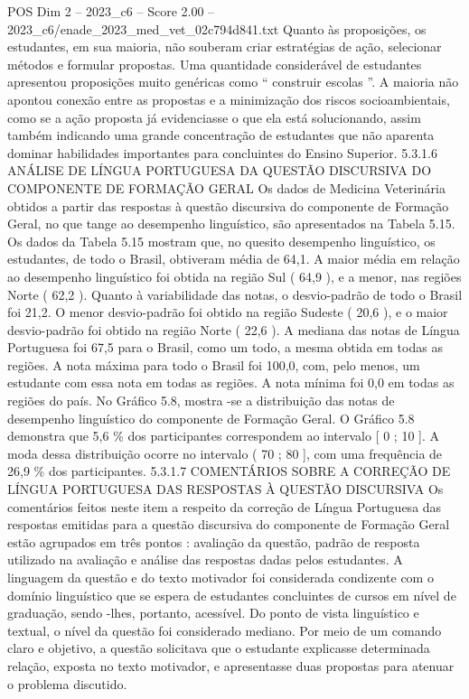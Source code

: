 \begin{textsample}{POS Dim 2 – 2023\_c6 – Score 2.00 – 2023\_c6/enade\_2023\_med\_vet\_02c794d841.txt}
Quanto às proposições, os estudantes, em sua maioria, não souberam criar estratégias de ação, selecionar métodos e formular propostas.
Uma quantidade considerável de estudantes apresentou proposições muito genéricas como “ construir escolas ”.
A maioria não apontou conexão entre as propostas e a minimização dos riscos socioambientais, como se a ação proposta já evidenciasse o que ela está solucionando, assim também indicando uma grande concentração de estudantes que não aparenta dominar habilidades importantes para concluintes do Ensino Superior. 5.3.1.6 ANÁLISE DE LÍNGUA PORTUGUESA DA QUESTÃO DISCURSIVA DO COMPONENTE DE FORMAÇÃO GERAL Os dados de Medicina Veterinária obtidos a partir das respostas à questão discursiva do componente de Formação Geral, no que tange ao desempenho linguístico, são apresentados na Tabela 5.15.
Os dados da Tabela 5.15 mostram que, no quesito desempenho linguístico, os estudantes, de todo o Brasil, obtiveram média de 64,1.
A maior média em relação ao desempenho linguístico foi obtida na região Sul ( 64,9 ), e a menor, nas regiões Norte ( 62,2 ).
Quanto à variabilidade das notas, o desvio-padrão de todo o Brasil foi 21,2.
O menor desvio-padrão foi obtido na região Sudeste ( 20,6 ), e o maior desvio-padrão foi obtido na região Norte ( 22,6 ).
A mediana das notas de Língua Portuguesa foi 67,5 para o Brasil, como um todo, a mesma obtida em todas as regiões.
A nota máxima para todo o Brasil foi 100,0, com, pelo menos, um estudante com essa nota em todas as regiões.
A nota mínima foi 0,0 em todas as regiões do país.
No Gráfico 5.8, mostra -se a distribuição das notas de desempenho linguístico do componente de Formação Geral.
O Gráfico 5.8 demonstra que 5,6 \% dos participantes correspondem ao intervalo [ 0 ; 10 ].
A moda dessa distribuição ocorre no intervalo ( 70 ; 80 ], com uma frequência de 26,9 \% dos participantes. 5.3.1.7 COMENTÁRIOS SOBRE A CORREÇÃO DE LÍNGUA PORTUGUESA DAS RESPOSTAS À QUESTÃO DISCURSIVA Os comentários feitos neste item a respeito da correção de Língua Portuguesa das respostas emitidas para a questão discursiva do componente de Formação Geral estão agrupados em três pontos : avaliação da questão, padrão de resposta utilizado na avaliação e análise das respostas dadas pelos estudantes.
A linguagem da questão e do texto motivador foi considerada condizente com o domínio linguístico que se espera de estudantes concluintes de cursos em nível de graduação, sendo -lhes, portanto, acessível.
Do ponto de vista linguístico e textual, o nível da questão foi considerado mediano.
Por meio de um comando claro e objetivo, a questão solicitava que o estudante explicasse determinada relação, exposta no texto motivador, e apresentasse duas propostas para atenuar o problema discutido.

\end{textsample}
